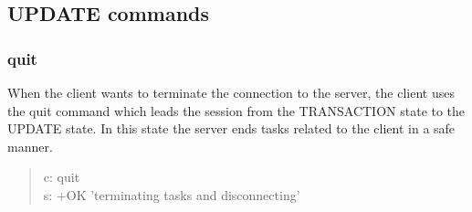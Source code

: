\documentclass[a4paper,11pt]{article}
\begin{document}
\subsection{UPDATE commands}
\subsubsection{quit}
When the client wants to terminate the connection to the server, the client uses the quit command which leads the session from the TRANSACTION state to the UPDATE state. In this state the server ends tasks related to the client in a safe manner.

\begin{quote}
  c: quit\\
  s: +OK 'terminating tasks and disconnecting'
\end{quote}
\end{document}
